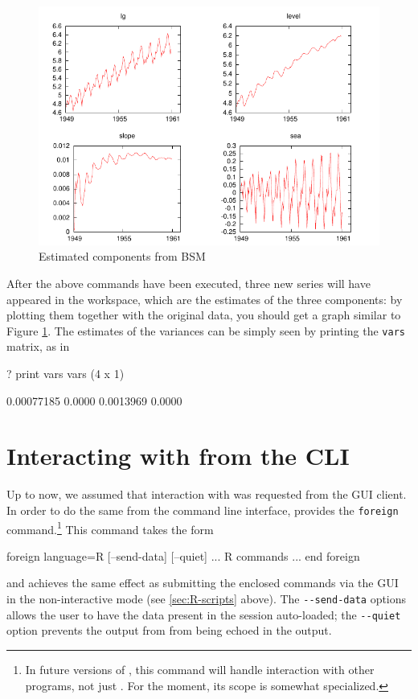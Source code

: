 \begin{figure}[htbp]
  \centering
  \includegraphics{figures/BSM-output}
  \caption{Estimated components from BSM}
  \label{fig:BSM-output}
\end{figure}

After the above commands have been executed, three new series will
have appeared in the  workspace, which are the estimates of
the three components: by plotting them together with the original
data, you should get a graph similar to Figure
\ref{fig:BSM-output}. The estimates of the variances can be simply
seen by printing the \texttt{vars} matrix, as in

\begin{code}
? print vars
vars (4 x 1)

  0.00077185 
      0.0000 
   0.0013969 
      0.0000 
\end{code}

\section{Interacting with  from the CLI}
\label{sec:foreign-command}

Up to now, we assumed that interaction with  was requested from
the GUI client. In order to do the same from the command
line interface,  provides the \texttt{foreign}
command.\footnote{In future versions of , this command will
  handle interaction with other programs, not just . For the
  moment, its scope is somewhat specialized.} This command takes the form
\begin{code}
foreign language=R [--send-data] [--quiet]
    ... R commands ...
end foreign
\end{code}
and achieves the same effect as submitting the enclosed 
commands via the GUI in the non-interactive mode (see
\ref{sec:R-scripts} above). The \verb|--send-data| options allows the
user to have the data present in the  session auto-loaded;
the \verb|--quiet| option prevents the output from  from being
echoed in the  output.

